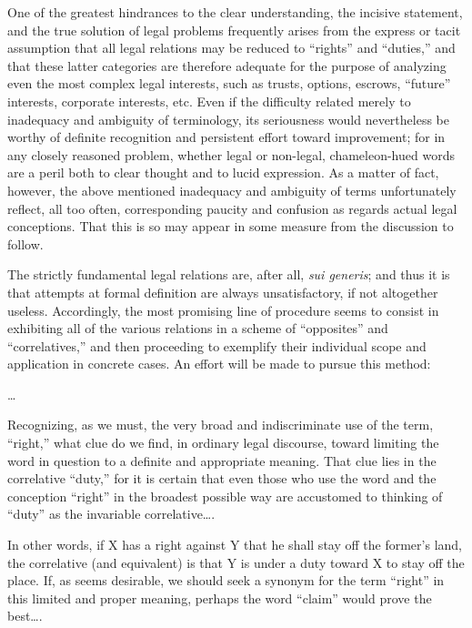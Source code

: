 
One of the greatest hindrances to the clear understanding, the incisive
statement, and the true solution of legal problems frequently arises from the
express or tacit assumption that all legal relations may be reduced to
``rights'' and ``duties,'' and that these latter categories are therefore
adequate for the purpose of analyzing even the most complex legal interests,
such as trusts, options, escrows, ``future'' interests, corporate interests,
etc. Even if the difficulty related merely to inadequacy and ambiguity of
terminology, its seriousness would nevertheless be worthy of definite
recognition and persistent effort toward improvement; for in any closely
reasoned problem, whether legal or non-legal, chameleon-hued words are a peril
both to clear thought and to lucid expression. As a matter of fact, however,
the above mentioned inadequacy and ambiguity of terms unfortunately reflect,
all too often, corresponding paucity and confusion as regards actual legal
conceptions. That this is so may appear in some measure from the discussion to
follow.

The strictly fundamental legal relations are, after all, \textit{sui generis};
and thus it is that attempts at formal definition are always unsatisfactory,
if not altogether useless. Accordingly, the most promising line of procedure
seems to consist in exhibiting all of the various relations in a scheme of
``opposites'' and ``correlatives,'' and then proceeding to exemplify their
individual scope and application in concrete cases. An effort will be made to
pursue this method: 


\ldots

Recognizing, as we must, the very broad and indiscriminate use of the term,
``right,'' what clue do we find, in ordinary legal discourse, toward limiting
the word in question to a definite and appropriate meaning. That clue lies in
the correlative ``duty,'' for it is certain that even those who use the word
and the conception ``right'' in the broadest possible way are accustomed to
thinking of ``duty'' as the invariable correlative\ldots .

In other words, if X has a right against Y that he shall stay off the former's
land, the correlative (and equivalent) is that Y is under a duty
toward X to stay off the place. If, as seems desirable, we should seek a
synonym for the term ``right'' in this limited and proper meaning, perhaps the
word ``claim'' would prove the best\ldots .

